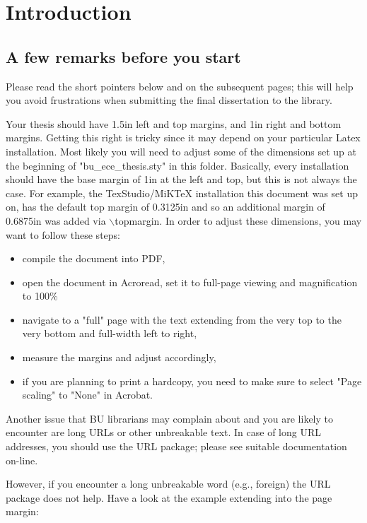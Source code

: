 \chapter{Introduction}
\label{chapter:Introduction}
\thispagestyle{myheadings}

\section{A few remarks before you start}
\label{sec:history}

Please read the short pointers below and on the subsequent pages; this will help
you avoid frustrations when submitting the final dissertation to the library.

Your thesis should have 1.5in left and top margins, and 1in right and bottom
margins. Getting this right is tricky since it may depend on your particular
Latex installation. Most likely you will need to adjust some of the dimensions
set up at the beginning of "bu\_ece\_thesis.sty" in this folder. Basically,
every installation should have the base margin of 1in at the left and top, but
this is not always the case. For example, the TexStudio/MiKTeX installation this
document was set up on, has the default top margin of 0.3125in and so an
additional margin of 0.6875in was added via $\backslash${topmargin}. In order to
adjust these dimensions, you may want to follow these steps:

\begin{itemize}
	\item compile the document into PDF,
	\item open the document in Acroread, set it to full-page viewing and
		magnification to 100\%
	\item navigate to a "full" page with the text extending from the very
		top to the very bottom and full-width left to right,
	\item measure the margins and adjust accordingly,
	\item if you are planning to print a hardcopy, you need to make sure
		to select "Page scaling" to "None" in Acrobat.
\end{itemize}

Another issue that BU librarians may complain about and you are likely to encounter
are long URLs or other unbreakable text. In case of long URL addresses, you
should use the URL package; please see suitable documentation on-line.

However, if you encounter a long unbreakable word (e.g., foreign) the URL
package does not help. Have a look at the example extending into the page
margin:

